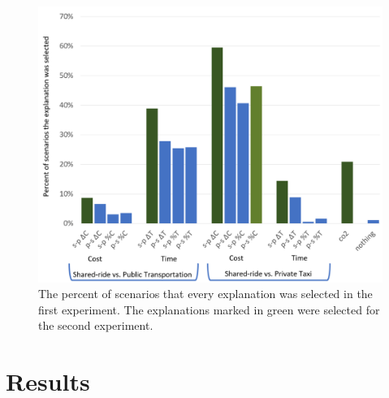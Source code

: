\documentclass[letterpaper]{article} %
\begin{document}








\begin{figure}[hbpt]
\centering
\includegraphics[width=\columnwidth]{bar_q1.pdf}  %
\caption{The percent of scenarios that every explanation was selected in the first experiment.
The explanations marked in green were selected for the second experiment.}
\label{fig:humanResults1}
\end{figure}

\section{Results}
\end{document}
